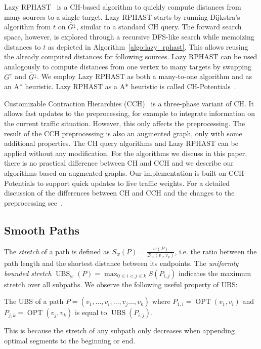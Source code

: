 \documentclass[a4paper,UKenglish,cleveref, autoref, thm-restate]{lipics-v2021}
\newcommand*{\dist}{\mathcal{D}}
\newcommand*{\shp}{\operatorname{OPT}}
\newcommand*{\ubs}{\operatorname{UBS}}
\newcommand*{\gchu}{G^{\uparrow}}
\newcommand*{\gchd}{\overleftarrow{G^{\downarrow}}}
\begin{document}
Lazy RPHAST~\cite{strasser_et_al:LIPIcs.SEA.2021.6} is a CH-based algorithm to quickly compute distances from many sources to a single target.
Lazy RPHAST starts by running Dijkstra's algorithm from $t$ on $\gchd$, similar to a standard CH query.
The forward search space, however, is explored through a recursive DFS-like search while memoizing distances to $t$ as depicted in Algorithm~\ref{algo:lazy_rphast}.
This allows reusing the already computed distances for following sources.
Lazy RPHAST can be used analogously to compute distances from one vertex to many targets by swapping $\gchu$ and $\gchd$.
We employ Lazy RPHAST as both a many-to-one algorithm and as an A* heuristic.
Lazy RPHAST as a A* heuristic is called CH-Potentials~\cite{strasser_et_al:LIPIcs.SEA.2021.6}.

Customizable Contraction Hierarchies (CCH)~\cite{dsw-cch-15} is a three-phase variant of CH.
It allows fast updates to the preprocessing, for example to integrate information on the current traffic situation.
However, this only affects the preprocessing.
The result of the CCH preprocessing is also an augmented graph, only with some additional properties.
The CH query algorithms and Lazy RPHAST can be applied without any modification.
For the algorithms we discuss in this paper, there is no practical difference between CH and CCH and we describe our algorithms based on augmented graphs.
Our implementation is built on CCH-Potentials to support quick updates to live traffic weights.
For a detailed discussion of the differences between CH and CCH and the changes to the preprocessing see~\cite{dsw-cch-15}.

\subsection{Smooth Paths}

The \emph{stretch} of a path is defined as $S_w(P) = \frac{w(P)}{\dist_w(v_1, v_k)}$, i.e. the ratio between the path length and the shortest distance between its endpoints.
The \emph{uniformly bounded stretch} $\ubs_w(P) = \max_{0 \leq i < j \leq k}S(P_{i,j})$ indicates the maximum stretch over all subpaths.
We observe the following useful property of UBS:
\begin{observation}\label{obs:append_sp_ubs}
The UBS of a path $P = (v_1, \dots, v_i, \dots, v_j \dots, v_k)$ where $P_{1,i} = \shp(v_1, v_i)$ and $P_{j,k} = \shp(v_j, v_k)$ is equal to $\ubs(P_{i,j})$.
\end{observation}
This is because the stretch of any subpath only decreases when appending optimal segments to the beginning or end.
\end{document}
